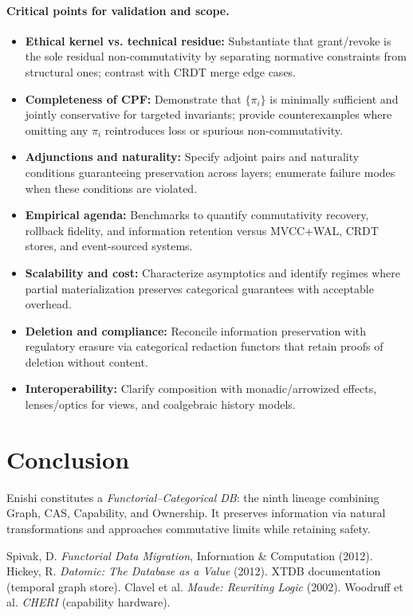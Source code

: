\documentclass[10pt]{article}
\begin{document}
\paragraph{Critical points for validation and scope.}
\begin{itemize}[nosep,leftmargin=*]
    \item \textbf{Ethical kernel vs. technical residue:} Substantiate that grant/revoke is the sole residual non-commutativity by separating normative constraints from structural ones; contrast with CRDT merge edge cases.
    \item \textbf{Completeness of CPF:} Demonstrate that $\{\pi_i\}$ is minimally sufficient and jointly conservative for targeted invariants; provide counterexamples where omitting any $\pi_i$ reintroduces loss or spurious non-commutativity.
    \item \textbf{Adjunctions and naturality:} Specify adjoint pairs and naturality conditions guaranteeing preservation across layers; enumerate failure modes when these conditions are violated.
    \item \textbf{Empirical agenda:} Benchmarks to quantify commutativity recovery, rollback fidelity, and information retention versus MVCC+WAL, CRDT stores, and event-sourced systems.
    \item \textbf{Scalability and cost:} Characterize asymptotics and identify regimes where partial materialization preserves categorical guarantees with acceptable overhead.
    \item \textbf{Deletion and compliance:} Reconcile information preservation with regulatory erasure via categorical redaction functors that retain proofs of deletion without content.
    \item \textbf{Interoperability:} Clarify composition with monadic/arrowized effects, lenses/optics for views, and coalgebraic history models.
\end{itemize}

\section{Conclusion}
Enishi constitutes a \emph{Functorial--Categorical DB}: the ninth lineage combining Graph, CAS, Capability, and Ownership.
It preserves information via natural transformations and approaches commutative limits while retaining safety.

\begin{thebibliography}{9}
 Spivak, D. \emph{Functorial Data Migration}, Information \& Computation (2012).
 Hickey, R. \emph{Datomic: The Database as a Value} (2012).
 XTDB documentation (temporal graph store).
 Clavel et al. \emph{Maude: Rewriting Logic} (2002).
 Woodruff et al. \emph{CHERI} (capability hardware).
\end{thebibliography}
\end{document}
